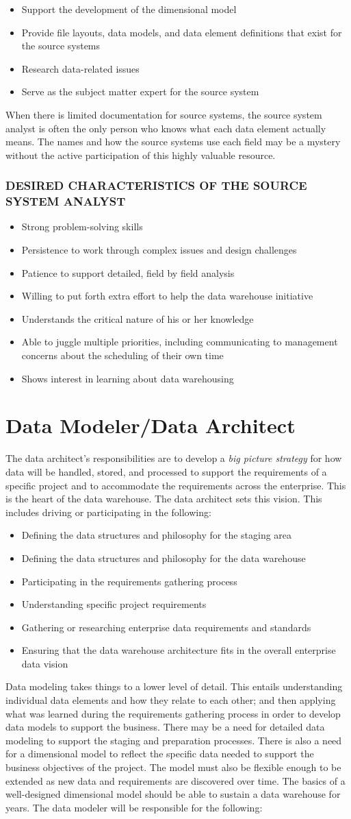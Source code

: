 \documentclass{vldb}
\newcommand{\bi}{\begin{itemize}}
\newcommand{\ei}{\end{itemize}}
\newcommand{\ii}{\item}
\begin{document}
\bi
\ii Support the development of the dimensional model
\ii Provide file layouts, data models, and data element definitions that exist for the source systems
\ii Research data-related issues
\ii Serve as the subject matter expert for the source system
\ei
When there is limited documentation for source systems, the source system analyst is often the only person who knows what each data element actually means. The names and how the source systems use each field may be a mystery without the active participation of this highly valuable resource.

\subsubsection*{DESIRED CHARACTERISTICS OF THE SOURCE SYSTEM ANALYST}
\bi
\ii Strong problem-solving skills
\ii Persistence to work through complex issues and design challenges
\ii Patience to support detailed, field by field analysis
\ii Willing to put forth extra effort to help the data warehouse initiative
\ii Understands the critical nature of his or her knowledge
\ii Able to juggle multiple priorities, including communicating to management concerns about the scheduling of their own time
\ii Shows interest in learning about data warehousing
\ei

\section{Data Modeler/Data Architect}
The data architect’s responsibilities are to develop a \textit{big picture strategy} for how data will be handled, stored, and processed to support the requirements of a specific project and to accommodate the requirements across the enterprise. 
This is the heart of the data warehouse. The data architect sets this vision. This includes driving or participating in the following:

\bi
\ii Defining the data structures and philosophy for the staging area 
\ii Defining the data structures and philosophy for the data warehouse 
\ii Participating in the requirements gathering process
\ii Understanding specific project requirements
\ii Gathering or researching enterprise data requirements and standards
\ii Ensuring that the data warehouse architecture fits in the overall enterprise data vision
\ei

Data modeling takes things to a lower level of detail. This entails understanding individual data elements and how they relate to each other; and then applying what was learned during the requirements gathering process in order to develop data models to support the business. There may be a need for detailed data modeling to support the staging and preparation processes. There is also a need for a dimensional model to reflect the specific data needed to support the business objectives of the project. The model must also be flexible enough to be extended as new data and requirements are discovered over time. The basics of a well-designed dimensional model should be able to sustain a data warehouse for years. The data modeler will be responsible for the following:
\end{document}
